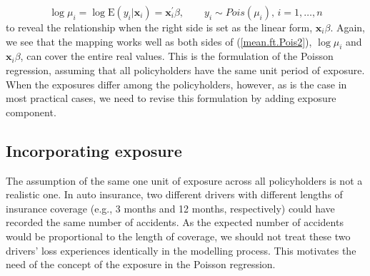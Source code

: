 \documentclass[12pt]{article}
\def\E{\mathrm{E}}
\begin{document}
\begin{equation}
\label{mean.ft.Pois2}
\log \mu_i=\log \E(y_i|\mathbf{ x}_i)=\mathbf{ x}^{\prime}_i\beta, \qquad y_i \sim Pois(\mu_i), \, i=1, \ldots, n
\end{equation} to reveal the relationship when the right side is set as the linear form, $\mathbf{ x}_i\beta$. Again, we see that the  mapping works well as both sides of (\ref{mean.ft.Pois2}), $\log \mu_i$ and $\mathbf{ x}_i\beta$, can cover the entire real values. 
This is the formulation of the Poisson regression, assuming that all policyholders have the same unit period of exposure. When the exposures differ among the policyholders, however, as is the case in most practical cases, we need to revise this formulation by adding  exposure component.

\subsection{Incorporating exposure}
The assumption of the same one unit of exposure across all policyholders is not a realistic one. In auto insurance, two different drivers with different lengths of insurance coverage (e.g., 3 months and 12 months, respectively) could have recorded the same number of accidents. As the expected number of accidents would be proportional to the length of coverage, we should not treat these two drivers' loss experiences identically in the modelling process. This motivates the need of the concept of the exposure in the Poisson regression. 
\end{document}
